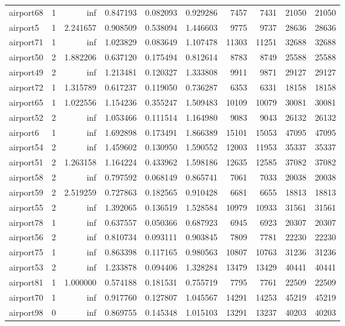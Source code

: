 \begin{longtable}{|l|r|r|r|r|r|r|r|r|r|}
airport68 & 1 & inf & 0.847193 & 0.082093 & 0.929286 & 7457 & 7431 & 21050 & 21050 \\
airport5 & 1 & 2.241657 & 0.908509 & 0.538094 & 1.446603 & 9775 & 9737 & 28636 & 28636 \\
airport71 & 1 & inf & 1.023829 & 0.083649 & 1.107478 & 11303 & 11251 & 32688 & 32688 \\
airport50 & 2 & 1.882206 & 0.637120 & 0.175494 & 0.812614 & 8783 & 8749 & 25588 & 25588 \\
airport49 & 2 & inf & 1.213481 & 0.120327 & 1.333808 & 9911 & 9871 & 29127 & 29127 \\
airport72 & 1 & 1.315789 & 0.617237 & 0.119050 & 0.736287 & 6353 & 6331 & 18158 & 18158 \\
airport65 & 1 & 1.022556 & 1.154236 & 0.355247 & 1.509483 & 10109 & 10079 & 30081 & 30081 \\
airport52 & 2 & inf & 1.053466 & 0.111514 & 1.164980 & 9083 & 9043 & 26132 & 26132 \\
airport6 & 1 & inf & 1.692898 & 0.173491 & 1.866389 & 15101 & 15053 & 47095 & 47095 \\
airport54 & 2 & inf & 1.459602 & 0.130950 & 1.590552 & 12003 & 11953 & 35337 & 35337 \\
airport51 & 2 & 1.263158 & 1.164224 & 0.433962 & 1.598186 & 12635 & 12585 & 37082 & 37082 \\
airport58 & 2 & inf & 0.797592 & 0.068149 & 0.865741 & 7061 & 7033 & 20038 & 20038 \\
airport59 & 2 & 2.519259 & 0.727863 & 0.182565 & 0.910428 & 6681 & 6655 & 18813 & 18813 \\
airport55 & 2 & inf & 1.392065 & 0.136519 & 1.528584 & 10979 & 10933 & 31561 & 31561 \\
airport78 & 1 & inf & 0.637557 & 0.050366 & 0.687923 & 6945 & 6923 & 20307 & 20307 \\
airport56 & 2 & inf & 0.810734 & 0.093111 & 0.903845 & 7809 & 7781 & 22230 & 22230 \\
airport75 & 1 & inf & 0.863398 & 0.117165 & 0.980563 & 10807 & 10763 & 31236 & 31236 \\
airport53 & 2 & inf & 1.233878 & 0.094406 & 1.328284 & 13479 & 13429 & 40441 & 40441 \\
airport81 & 1 & 1.000000 & 0.574188 & 0.181531 & 0.755719 & 7795 & 7761 & 22509 & 22509 \\
airport70 & 1 & inf & 0.917760 & 0.127807 & 1.045567 & 14291 & 14253 & 45219 & 45219 \\
airport98 & 0 & inf & 0.869755 & 0.145348 & 1.015103 & 13291 & 13237 & 40203 & 40203 \\

\end{longtable}
